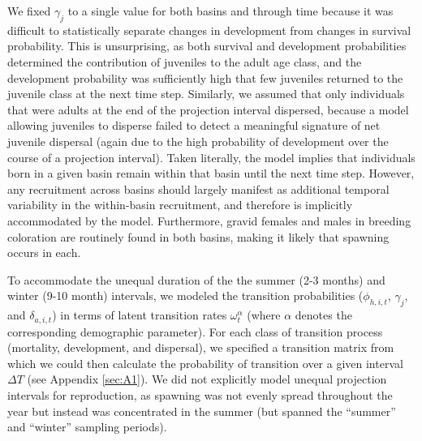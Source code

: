 %
We fixed $\gamma_{j}$ to a single value for both basins and through time because 
it was difficult to statistically separate changes in development from changes 
in survival probability.
This is unsurprising, as both survival and development probabilities
determined the contribution of juveniles to the adult age class,
and the development probability was sufficiently 
high that few juveniles returned to the juvenile class at the next time step. 
Similarly, we assumed that only individuals that were adults at the end of the projection
interval dispersed, because a model allowing juveniles to disperse failed to detect 
a meaningful signature of net juvenile dispersal 
(again due to the high probability of development over the course of a projection interval).
Taken literally, the model implies that individuals born in a given basin
remain within that basin until the next time step.
However, any recruitment across basins should largely manifest 
as additional temporal variability in the within-basin recruitment,
and therefore is implicitly accommodated by the model.
Furthermore, gravid females and males in breeding coloration are 
routinely found in both basins, making it likely that spawning occurs in each.

To accommodate the unequal duration of the the summer (2-3 months) and winter (9-10 month)
intervals, we modeled the transition probabilities 
($\phi_{h,i,t}$, $\gamma_{j}$, and $\delta_{a,i,t}$)
in terms of latent transition rates $\omega^{\alpha}_{t}$ 
(where $\alpha$ denotes the corresponding demographic parameter).
For each class of transition process (mortality, development, and dispersal),
we specified a transition matrix from which we could then calculate
the probability of transition over a given interval $\Delta T$ 
(see Appendix \ref{sec:A1}).
We did not explicitly model unequal projection intervals for reproduction,
as spawning was not evenly spread throughout the year but instead was concentrated
in the summer (but spanned the ``summer'' and ``winter'' sampling periods).

